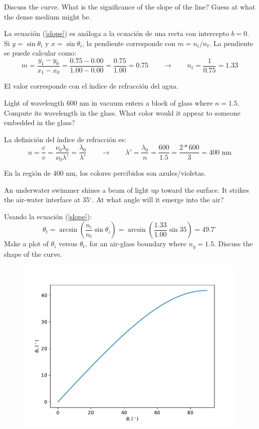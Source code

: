 \documentclass[addpoints,10pt]{exam}
\begin{document}
\begin{questions}
		{
			\question
			Discuss the curve.
			What is the significance of the slope of the line? Guess at what the dense medium might be.
		}
		
		La ecuaci\'on (\ref{slope}) es an\'aloga a la ecuaci\'on de una recta con intercepto $b = 0$. Si $y = \sin \theta_t$ y $x = \sin \theta_i$, la pendiente corresponde con $m = n_i/n_t$. La pendiente se puede calcular como:
		\begin{equation}
			m = \dfrac{y_1 - y_0}{x_1 - x_0} = \dfrac{0.75 - 0.00}{1.00 - 0.00} = \dfrac{0.75}{1.00} = 0.75 \qquad \longrightarrow \qquad n_t = \dfrac{1}{0.75} = 1.33
		\end{equation}
		
		El valor corresponde con el \'indice de refracci\'on del agua.
		
		{
			\question
			Light of wavelength 600 nm in vacuum enters a block of glass where $n = 1.5$. Compute its wavelength in the glass. What color would it appear to someone embedded in the glass?
		}
		
		La definici\'on del \'indice de refracci\'on es:
		\begin{equation}
			n = \dfrac{c}{v} = \dfrac{\nu_0\lambda_0}{\nu_0\lambda'} = \dfrac{\lambda_0}{\lambda'} \qquad \longrightarrow \qquad \lambda' = \dfrac{\lambda_0}{n} = \dfrac{600}{1.5} = \dfrac{2 * 600}{3} = 400 \text{ nm}
		\end{equation}
		
		En la regi\'on de 400 nm, los colores percibidos son azules/violetas.
		
		{
			\question
			An underwater swimmer shines a beam of light up toward the
			surface. It strikes the air-water interface at 35$^\circ$. At what angle will it	emerge into the air?
		}
		
		Usando la ecuaci\'on (\ref{slope}):
		\begin{equation}
			\theta_t = \arcsin\left(\dfrac{n_i}{n_t}\sin\theta_i\right) = \arcsin\left(\dfrac{1.33}{1.00}\sin35\right) = 49.7 ^\circ
		\end{equation}
		{
			\question
			Make a plot of $\theta_i$ versus $\theta_t$, for an air-glass boundary where
			$n_{g} = 1.5$. Discuss the shape of the curve.
		}
		
		\begin{figure}[h]
			\centering
			\includegraphics[width = 0.6\linewidth]{418.pdf}
		\end{figure}
		

\end{questions}
\end{document}
